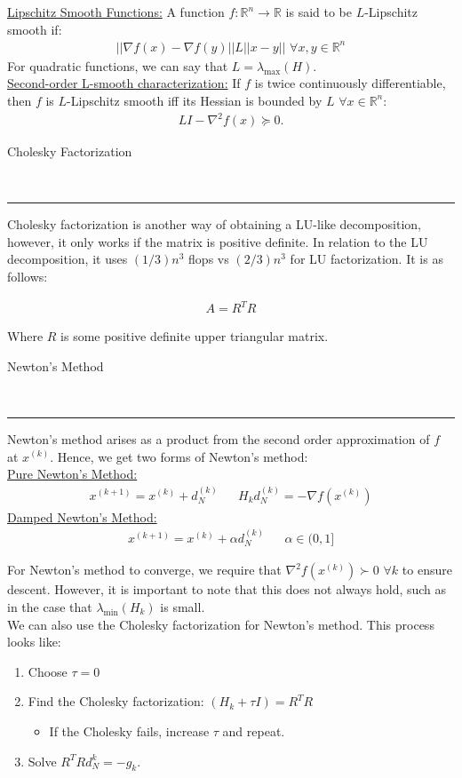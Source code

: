 \documentclass{article}
\newcommand{\header}[1]{\begin{large}\noindent #1\end{large}\\\rule{\textwidth}{0.5pt}}
\newcommand{\norm}[2]{\left\lvert\left\lvert#1\right\rvert\right\rvert}
\newcommand{\sheader}[1]{\underline{#1:}}
\newcommand{\gap}{\medskip\\}
\newcommand{\sgap}{\smallskip\\}
\begin{document}
\sheader{Lipschitz Smooth Functions}
A function $f: \mathbb{R}^n \to \mathbb{R}$ is said to be $L$-Lipschitz smooth if:
\begin{align*}
    \norm{\nabla f(x) - \nabla f(y)} \leq L\norm{x - y}\,\,\, \forall x, y \in \mathbb{R}^n
\end{align*}
For quadratic functions, we can say that $L = \lambda_{\max} (H)$.
\sgap
\sheader{Second-order L-smooth characterization} If $f$ is twice continuously differentiable,
then $f$ is $L$-Lipschitz smooth iff its Hessian is bounded by $L\,\, \forall x \in \mathbb{R}^n$:
\begin{align*}
    LI - \nabla^2 f(x) \succeq 0.
\end{align*}
\pagebreak

\header{Cholesky Factorization}

Cholesky factorization is another way of obtaining a LU-like decomposition, however, it only works
if the matrix is positive definite. In relation to the LU decomposition, it uses $(1/3)n^3$ flops
vs $(2/3)n^3$ for LU factorization. It is as follows:

\begin{align*}
    A = R^T R
\end{align*}

Where $R$ is some positive definite upper triangular matrix.
\gap
\header{Newton's Method}
Newton's method arises as a product from the second order approximation of $f$ at $x^{(k)}$. Hence,
we get two forms of Newton's method:
\gap
\sheader{Pure Newton's Method}
\begin{align*}
    x^{(k + 1)} = x^{(k)} + d_N^{(k)} && H_k d_N^{(k)} = - \nabla f(x^{(k)})
\end{align*}
\sheader{Damped Newton's Method}
\begin{align*}
    x^{(k + 1)} = x^{(k)} + \alpha d_N^{(k)} && \alpha \in (0, 1]
\end{align*}

For Newton's method to converge, we require that $\nabla^2 f(x^{(k)}) \succ 0 \,\, \forall k$ 
to ensure descent. However, it is important to note that this does not always hold, such 
as in the case that $\lambda_{\min} (H_k)$ is small.
\gap 
We can also use the Cholesky factorization for Newton's method. This process looks like:
\begin{enumerate}
    \item Choose $\tau = 0$
    \item Find the Cholesky factorization: $(H_k + \tau I) = R^TR$
    \begin{itemize}
        \item If the Cholesky fails, increase $\tau$ and repeat.
    \end{itemize}
    \item Solve $R^TR d_N^k = -g_k$.
\end{enumerate}
\end{document}
